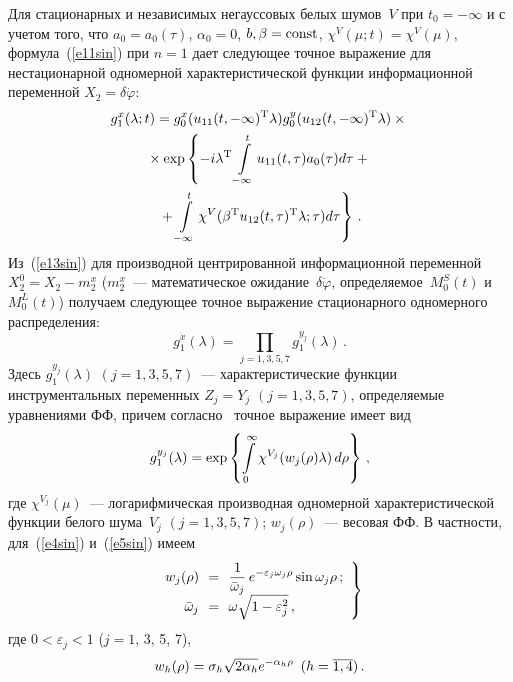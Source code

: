 \begin{multicols}{2}
Для стационарных и независимых негауссовых белых шумов~$V$ при $t_0=-\infty$ и с учетом того, 
что $a_0=a_0(\tau)$, $\alpha_0=0$, $b,\beta={\rm const}$, $\chi^V (\mu;t) =\chi^V(\mu)$,
формула~(\ref{e11sin}) при $n=1$ дает следующее точное выражение
для нестационарной одномерной характеристической функции информационной переменной  $X_2 =\delta \dot\varphi$:
\begin{multline}
g_1^x (\lambda;t) =g_0^x (u_{11} (t,-\infty)^{\mathrm{T}}\lambda)g_0^y (u_{12} (t,-\infty)^{\mathrm{T}}\lambda)\times{}\\
{}\times \exp\left \{ -i\lambda^{\mathrm{T}} \int\limits_{-\infty}^t u_{11}(t,\tau) a_0(\tau) d\tau+{}\right.\\
\left.{}+
    \int\limits_{-\infty}^t \chi^V (\beta^{\mathrm{T}} u_{12} (t,\tau)^{\mathrm{T}} \lambda;\tau) d\tau\right \}\,.
    \label{e13sin}
    \end{multline}
Из~(\ref{e13sin}) для производной центрированной информационной переменной $X_2^0 = X_2-m_2^x$ ($m_2^x$~--- математическое 
ожидание~$\delta\dot\varphi$, определяемое~$M_0^S(t)$ и~$M_0^L(t)$)
получаем следующее точное выражение стационарного одномерного распределения:
\begin{equation}
g_1^{\dot x} (\lambda)=\prod\limits_{j=1,3,5,7} g_1^{y_j}(\lambda)\,.
\label{e14sin}
\end{equation}
Здесь $g_1^{y_j}(\lambda)$ $(j=1,3,5,7)$~--- характеристические функции инструментальных переменных
$Z_j =Y_j$ $(j=1,3,5,7)$, определяемые уравнениями ФФ, причем согласно~\cite{7sin, 8sin} точное выражение имеет вид
    \begin{equation}
    g_1^{y_j}(\lambda)=\exp \left \{ \int\limits_0^\infty \chi^{V_j} (w_j (\rho)\lambda)\,d\rho\right \}\,,
    \label{e15sin}
    \end{equation}
где $\chi^{V_j}(\mu)$~--- логарифмическая производная одномерной характеристической функции
белого шума~$V_j$ $(j=1, 3, 5, 7)$; $w_j(\rho)$~--- весовая ФФ. В част\-ности, для~(\ref{e4sin}) и~(\ref{e5sin}) имеем
\begin{equation}
\left.
\begin{array}{rcl}
w_j (\rho)\!\! &=&\!\!\fr{1}{\bar \omega_j}\, e^{-\varepsilon_j \omega_j \rho} \sin \omega_j\rho\,;\\[6pt]
\bar \omega_j\!\! &=&\!\! \omega \sqrt{1-\varepsilon_j^2}\,,
\end{array}
\right \}
\label{e16sin}
\end{equation}
где $0< \varepsilon_j<1$ ($j=1$, 3, 5, 7),
\begin{equation}
w_h (\rho) =\sigma_h \sqrt{2\alpha_h} e^{-\alpha_h \rho} \enskip (h=\overline{1,4})\,.
\label{e17sin}
\end{equation}


\end{multicols}
